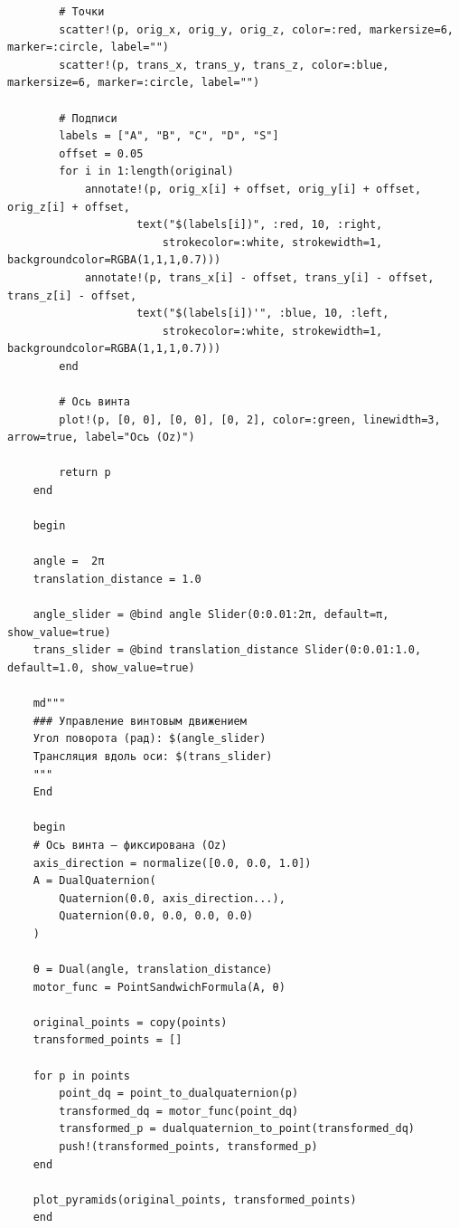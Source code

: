\begin{verbatim}
        # Точки
        scatter!(p, orig_x, orig_y, orig_z, color=:red, markersize=6, marker=:circle, label="")
        scatter!(p, trans_x, trans_y, trans_z, color=:blue, markersize=6, marker=:circle, label="")

        # Подписи
        labels = ["A", "B", "C", "D", "S"]
        offset = 0.05
        for i in 1:length(original)
            annotate!(p, orig_x[i] + offset, orig_y[i] + offset, orig_z[i] + offset, 
                    text("$(labels[i])", :red, 10, :right, 
                        strokecolor=:white, strokewidth=1, backgroundcolor=RGBA(1,1,1,0.7)))
            annotate!(p, trans_x[i] - offset, trans_y[i] - offset, trans_z[i] - offset, 
                    text("$(labels[i])'", :blue, 10, :left,
                        strokecolor=:white, strokewidth=1, backgroundcolor=RGBA(1,1,1,0.7)))
        end

        # Ось винта
        plot!(p, [0, 0], [0, 0], [0, 2], color=:green, linewidth=3, arrow=true, label="Ось (Oz)")
        
        return p
    end

    begin

    angle =  2π
    translation_distance = 1.0

    angle_slider = @bind angle Slider(0:0.01:2π, default=π, show_value=true)
    trans_slider = @bind translation_distance Slider(0:0.01:1.0, default=1.0, show_value=true)

    md"""
    ### Управление винтовым движением
    Угол поворота (рад): $(angle_slider)  
    Трансляция вдоль оси: $(trans_slider)
    """
    End

    begin
    # Ось винта — фиксирована (Oz)
    axis_direction = normalize([0.0, 0.0, 1.0])
    A = DualQuaternion(
        Quaternion(0.0, axis_direction...), 
        Quaternion(0.0, 0.0, 0.0, 0.0)
    )
    
    θ = Dual(angle, translation_distance)
    motor_func = PointSandwichFormula(A, θ)
    
    original_points = copy(points)
    transformed_points = []
    
    for p in points
        point_dq = point_to_dualquaternion(p)
        transformed_dq = motor_func(point_dq)
        transformed_p = dualquaternion_to_point(transformed_dq)
        push!(transformed_points, transformed_p)
    end
    
    plot_pyramids(original_points, transformed_points)
    end

\end{verbatim}

